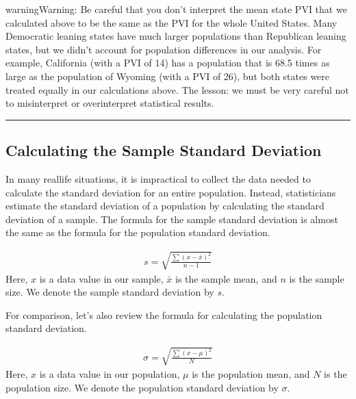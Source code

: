 \documentclass[letterpaper,10pt,english]{jupyterBook}
\begin{document}
\begin{sphinxadmonition}{warning}{Warning:}
\sphinxAtStartPar
Be careful that you don’t interpret the mean state PVI that we calculated above to be the same as the PVI for the whole United States. Many Democratic leaning states have much larger populations than Republican leaning states, but we didn’t account for population differences in our analysis. For example, California (with a PVI of \sphinxhyphen{}14) has a population that is 68.5 times as large as the population of Wyoming (with a PVI of 26), but both states were treated equally in our calculations above. The lesson: we must be very careful not to misinterpret or over\sphinxhyphen{}interpret statistical results.
\end{sphinxadmonition}


\bigskip\hrule\bigskip



\subsection{Calculating the Sample Standard Deviation}
\label{\detokenize{Ch2 Descriptive Statistics/2.3 Measures of Dispersion:calculating-the-sample-standard-deviation}}
\sphinxAtStartPar
In many real\sphinxhyphen{}life situations, it is impractical to collect the data needed to calculate the standard deviation for an entire population. Instead, statisticians estimate the standard deviation of a population by calculating the standard deviation of a sample. The formula for the sample standard deviation is almost the same as the formula for the population standard deviation.

\sphinxAtStartPar
{}
\begin{equation*}
\begin{split} s = \sqrt{\frac{\sum(x - \bar{x})^2}{n - 1}} \end{split}
\end{equation*}
\sphinxAtStartPar
Here, \(x\) is a data value in our sample, \(\bar{x}\) is the sample mean, and \(n\) is the sample size. We denote the sample standard deviation by \(s\).

\sphinxAtStartPar
For comparison, let’s also review the formula for calculating the population standard deviation.

\sphinxAtStartPar
{}
\begin{equation*}
\begin{split} \sigma = \sqrt{\frac{\sum(x - \mu)^2}{N}} \end{split}
\end{equation*}
\sphinxAtStartPar
Here, \(x\) is a data value in our population, \(\mu\) is the population mean, and \(N\) is the population size. We denote the population standard deviation by \(\sigma\).
\end{document}
